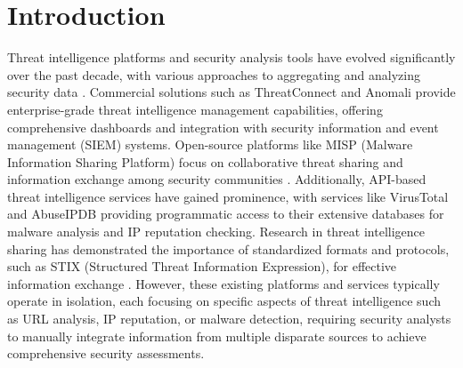 \documentclass[pdflatex,sn-mathphys-num]{sn-jnl}%
\theoremstyle{thmstyleone}%
\theoremstyle{thmstyletwo}%
\theoremstyle{thmstylethree}%
\begin{document}



\maketitle

\section{Introduction}\label{sec1}

Threat intelligence platforms and security analysis tools have evolved significantly over the past decade, with various approaches to aggregating and analyzing security data \cite{bib10}. Commercial solutions such as ThreatConnect and Anomali provide enterprise-grade threat intelligence management capabilities, offering comprehensive dashboards and integration with security information and event management (SIEM) systems. Open-source platforms like MISP (Malware Information Sharing Platform) focus on collaborative threat sharing and information exchange among security communities \cite{bib11}. Additionally, API-based threat intelligence services have gained prominence, with services like VirusTotal and AbuseIPDB providing programmatic access to their extensive databases for malware analysis and IP reputation checking. Research in threat intelligence sharing has demonstrated the importance of standardized formats and protocols, such as STIX (Structured Threat Information Expression), for effective information exchange \cite{bib4}. However, these existing platforms and services typically operate in isolation, each focusing on specific aspects of threat intelligence such as URL analysis, IP reputation, or malware detection, requiring security analysts to manually integrate information from multiple disparate sources to achieve comprehensive security assessments.
\end{document}

